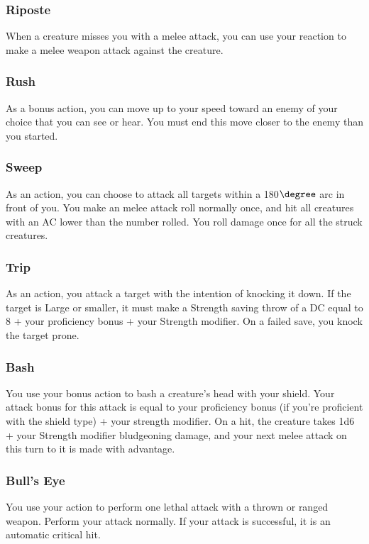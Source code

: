 \subsubsection{Riposte} \label{tec::riposte}
When a creature misses you with a melee attack, you can use your reaction to make a melee weapon attack against the creature.

\subsubsection{Rush} \label{tec::rush}
As a bonus action, you can move up to your speed toward an enemy of your choice that you can see or hear.
You must end this move closer to the enemy than you started.

\subsubsection{Sweep} \label{tec::sweep}
As an action, you can choose to attack all targets within a 180$\degree$ arc in front of you.
You make an melee attack roll normally once, and hit all creatures with an AC lower than the number rolled.
You roll damage once for all the struck creatures.

\subsubsection{Trip} \label{tec::trip}
As an action, you attack a target with the intention of knocking it down.
If the target is Large or smaller, it must make a Strength saving throw of a DC equal to 8 + your proficiency bonus + your Strength modifier.
On a failed save, you knock the target prone.

\subsubsection{Bash} \label{tec::bash}
You use your bonus action to bash a creature's head with your shield.
Your attack bonus for this attack is equal to your proficiency bonus (if you're proficient with the shield type) + your strength modifier.
On a hit, the creature takes 1d6 + your Strength modifier bludgeoning damage, and your next melee attack on this turn to it is made with advantage.

\subsubsection{Bull's Eye} \label{tec::bullseye}
You use your action to perform one lethal attack with a thrown or ranged weapon.
Perform your attack normally.
If your attack is successful, it is an automatic critical hit.


